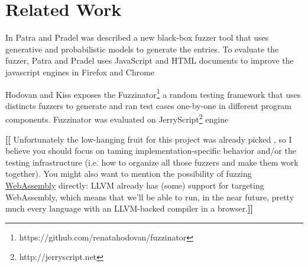 \documentclass[11pt]{article}
\newcommand{\Fix}[1]{\textbf{[[}{\color{red} #1}\textbf{]]}}
\newcommand{\Mar}[1]{\textbf{[[}{\color{blue} #1}\textbf{]]}}
\newcommand{\MAB}[1]{\textbf{[[}{\color{darkgreen} #1}\textbf{]]}}
\begin{document}
\section{Related Work}

In Patra and Pradel \cite{patra2016learning} was described a new black-box fuzzer tool 
that uses generative and probabilistic models to generate the entries. To evaluate the fuzzer,
Patra and Pradel uses JavaScript and HTML documents to improve the javascript engines
in Firefox and Chrome


Hodovan and Kiss \cite{hodovan-fuzzinator} exposes the Fuzzinator\footnote{https://github.com/renatahodovan/fuzzinator}
a random testing framework that uses distincts fuzzers to generate and ran test cases one-by-one in different
program components. Fuzzinator was evaluated on JerryScript\footnote{http://jerryscript.net} 
engine


\MAB{Unfortunately the low-hanging fruit for this project was already
  picked \cite{patra2016learning}, so I believe you should focus on
  taming implementation-specific behavior and/or the testing
  infrastructure (i.e. how to organize all those fuzzers and make them
  work together). You might also want to mention the possibility of
  fuzzing
  \href{https://developer.mozilla.org/en-US/docs/WebAssembly}{WebAssembly}
  directly: LLVM already has (some) support for targeting WebAssembly,
  which means that we'll be able to run, in the near future, pretty
  much every language with an LLVM-backed compiler in a browser.}
\end{document}
